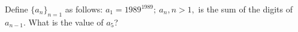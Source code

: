 Define $ \{ a_n \}_{n=1}$ as follows: $ a_1 = 1989^{1989}; \ a_n, n > 1,$ is the sum of the digits of $ a_{n-1}$. What is the value of $ a_5$?